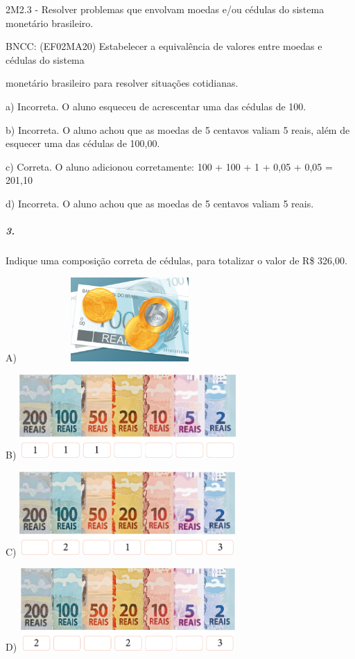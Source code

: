 2M2.3 - Resolver problemas que envolvam moedas e/ou cédulas do sistema
monetário brasileiro.

BNCC: (EF02MA20) Estabelecer a equivalência de valores entre moedas e
cédulas do sistema

monetário brasileiro para resolver situações cotidianas.

a) Incorreta. O aluno esqueceu de acrescentar uma das cédulas de 100.

b) Incorreta. O aluno achou que as moedas de 5 centavos valiam 5 reais,
além de esquecer uma das cédulas de 100,00.

c) Correta. O aluno adicionou corretamente: 100 + 100 + 1 + 0,05 + 0,05
= 201,10

d) Incorreta. O aluno achou que as moedas de 5 centavos valiam 5 reais.

\subparagraph{3.}\label{section-67}

Indique uma composição correta de cédulas, para totalizar o valor de R\$
326,00.

A) \includegraphics[width=3.30208in,height=1.25892in]{media/image79.png}

B) \includegraphics[width=3.24468in,height=1.27083in]{media/image80.png}

C) \includegraphics[width=3.23529in,height=1.26042in]{media/image81.png}

D) \includegraphics[width=3.23370in,height=1.23958in]{media/image82.png}

